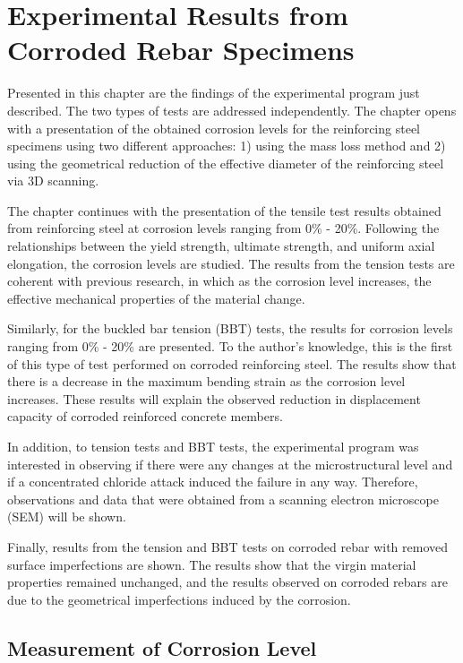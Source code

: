 \chapter{Experimental Results from Corroded Rebar Specimens}
\label{chap-four}
Presented in this chapter are the findings of the experimental program just described. The two types of tests are addressed independently. The chapter opens with a presentation of the obtained corrosion levels for the reinforcing steel specimens using two different approaches: 1) using the mass loss method and 2) using the geometrical reduction of the effective diameter of the reinforcing steel via 3D scanning. 

The chapter continues with the presentation of the tensile test results obtained from reinforcing steel at corrosion levels ranging from 0\% - 20\%. Following the relationships between the yield strength, ultimate strength, and uniform axial elongation, the corrosion levels are studied. The results from the tension tests are coherent with previous research, in which as the corrosion level increases, the effective mechanical properties of the material change. 

Similarly, for the buckled bar tension (BBT) tests, the results for corrosion levels ranging from 0\% - 20\% are presented. To the author’s knowledge, this is the first of this type of test performed on corroded reinforcing steel. The results show that there is a decrease in the maximum bending strain as the corrosion level increases. These results will explain the observed reduction in displacement capacity of corroded reinforced concrete members. 

In addition, to tension tests and BBT tests, the experimental program was interested in observing if there were any changes at the microstructural level and if a concentrated chloride attack induced the failure in any way. Therefore, observations and data that were obtained from a scanning electron microscope (SEM) will be shown.

Finally, results from the tension and BBT tests on corroded rebar with removed surface imperfections are shown. The results show that the virgin material properties remained unchanged, and the results observed on corroded rebars are due to the geometrical imperfections induced by the corrosion.

\section{Measurement of Corrosion Level}

